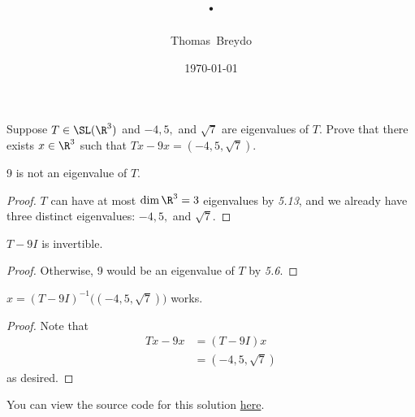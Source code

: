\documentclass{amsart}
\title{\pagenum.\probnum}
\author{Thomas\ Breydo}
\date{\today}
\newcommand{\pagenum}{141}
\newcommand{\probnum}{30}
\begin{document}
\maketitle

\begin{problem*}
Suppose $T\in\SL(\R^3)$ and $-4,5,$ and $\sqrt 7$
are eigenvalues of $T.$ Prove that there exists $x\in\R^3$
such that $Tx-9x=(-4,5,\sqrt 7).$
\end{problem*}

\vspace{0.5in}

\begin{claim*}
9 is not an eigenvalue of $T.$
\end{claim*}
\begin{proof}
$T$ can have at most $\dim\R^3=3$ eigenvalues by \textit{5.13},
and we already have three distinct eigenvalues: $-4,5,$ and
$\sqrt 7$.
\end{proof}

\begin{claim*}
$T-9I$ is invertible.
\end{claim*}
\begin{proof}
Otherwise, 9 would be an eigenvalue of $T$ by \textit{5.6}.
\end{proof}

\begin{claim*}
    $x=(T-9I)^{-1}\big((-4,5,\sqrt 7)\big)$ works.
\end{claim*}
\begin{proof} Note that
\begin{align*} 
    Tx-9x &= (T-9I)x \\
          &= (-4,5,\sqrt 7)
\end{align*}
as desired.
\end{proof}

\vspace{0.5in}

\begin{note*}
You can view the source code for this solution
\href{https://github.com/thomasbreydo/linalg/blob/main/\pagenum_\probnum_Thomas_Breydo.tex}
{here}.
\end{note*}
\end{document}
